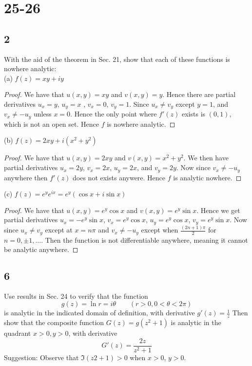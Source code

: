 \documentclass{article}
\begin{document}
    \section*{25-26}
    \subsection*{2}
    With the aid of the theorem in Sec. 21, show that each of these functions is nowhere analytic:\\
    (a) $f(z)=xy+iy$
    \begin{proof}
        We have that $u(x,y)=xy$ and $v(x,y)=y$. Hence there are partial derivatives $u_x=y$, $u_y=x$
        , $v_x=0$, $v_y=1$. Since $u_x \neq v_y$ except $y=1$, and $v_x \neq -u_y$ unless $x=0$. Hence the
        only point where $f'(z)$ exists is $(0, 1)$, which is not an open set. Hence $f$ is nowhere analytic.
    \end{proof}
    (b) $f(z)=2xy+ i(x^2+y^2)$
    \begin{proof}
        We have that $u(x,y)=2xy$ and $v(x,y)=x^2+y^2$. We then have partial derivatives $u_x = 2y$,
        $v_x=2x$, $u_y=2x$, and $v_y=2y$. Now since $v_x \neq -u_y$ anywhere then $f'(z)$ does not exists
        anywere. Hence $f$ is analytic nowhere.
    \end{proof}
    (c) $f(z)=e^y e^{ix}=e^y(\cos x + i\sin x)$
    \begin{proof}
        We have that $u(x,y)=e^y\cos x$ and $v(x,y) = e^y\sin x$. Hence we get partial derivatives
        $u_x=-e^y\sin x$, $v_x=e^y\cos x$, $u_y=e^y \cos x$, $v_y=e^y\sin x$. Now since
        $u_x \neq v_y$ except at $x = n\pi$ and $v_x \neq -u_y$ except when
        $\frac{(2n+1)\pi}{2}$ for $n=0,\pm1,...$. Then the function is not differentiable
        anywhere, meaning it cannot be analytic anywhere.
    \end{proof}
    \subsection*{6}
    Use results in Sec. 24 to verify that the function $$g(z) = \ln r = i\theta \qquad (r > 0, 0 < \theta < 2\pi)$$
    is analytic in the indicated domain of definition, with derivative $g'(z) = \frac{1}{z}$
    Then show that the composite function $G(z) = g(z^2 + 1)$ is analytic in the quadrant $x > 0, y > 0$, with derivative
    $$G'(z)=\frac{2z}{z^2 + 1}$$ Suggestion: Observe that $\Im(z2 + 1) > 0$ when $x > 0$, $y > 0$.
\end{document}
